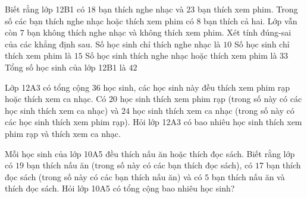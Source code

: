 \begin{ex}
 Biết rằng lớp 12B1 có ${18}$ bạn thích nghe nhạc và ${23}$ bạn thích xem phim. Trong số các bạn thích nghe nhạc hoặc thích xem phim có ${8}$ bạn thích cả hai. Lớp vẫn còn ${7}$ bạn không thích nghe nhạc và không thích xem phim. Xét tính đúng-sai của các khẳng định sau.
\choiceTFt
{ \True Số học sinh chỉ thích nghe nhạc là ${10}$ }
   { \True Số học sinh chỉ thích xem phim là ${15}$ }
     { \True Số học sinh thích nghe nhạc hoặc thích xem phim là ${33}$ }
    { Tổng số học sinh của lớp 12B1 là ${42}$ }
\end{ex}
\begin{ex}
 Lớp 12A3 có tổng cộng ${36}$ học sinh, các học sinh này đều thích xem phim rạp hoặc thích xem ca nhạc. Có ${20}$ học sinh thích xem phim rạp (trong số này có các học sinh thích xem ca nhạc) và ${24}$ học sinh thích xem ca nhạc (trong số này có các học sinh thích xem phim rạp). Hỏi lớp 12A3 có bao nhiêu học sinh thích xem phim rạp và thích xem ca nhạc.

\end{ex}

\begin{ex}
 Mỗi học sinh của lớp 10A5 đều thích nấu ăn hoặc thích đọc sách. Biết rằng lớp có ${19}$ bạn thích nấu ăn (trong số này có các bạn thích đọc sách), có ${17}$ bạn thích đọc sách (trong số này có các bạn thích nấu ăn) và có ${5}$ bạn thích nấu ăn và thích đọc sách. Hỏi lớp 10A5 có tổng cộng bao nhiêu học sinh?

\end{ex}

